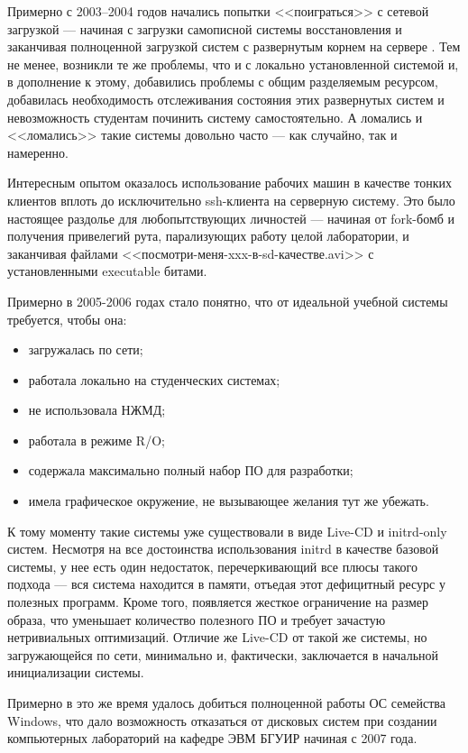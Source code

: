 \documentclass[10pt, a5paper]{article}
\begin{document}
Примерно с 2003--2004 годов начались попытки <<поиграться>> с сетевой загрузкой  --- начиная с загрузки самописной системы восстановления и заканчивая полноценной загрузкой систем с развернутым корнем на сервере \cite{SP01}. Тем не менее, возникли те же проблемы, что и с локально  установленной системой и, в дополнение к этому, добавились проблемы с общим разделяемым ресурсом, добавилась необходимость отслеживания состояния этих развернутых систем и невозможность студентам починить систему самостоятельно. А ломались и <<ломались>> такие системы довольно часто --- как случайно, так и намеренно.

Интересным опытом оказалось использование рабочих машин в качестве тонких клиентов вплоть до исключительно ssh-клиента на серверную систему. Это было настоящее раздолье для любопытствующих личностей --- начиная от fork-бомб и получения привелегий рута, парализующих работу целой лаборатории, и заканчивая файлами <<посмотри-меня-xxx-в-sd-качестве.avi>> с установленными executable битами.

Примерно в 2005-2006 годах стало понятно, что от идеальной учебной системы требуется, чтобы она:

\begin{itemize}
  \item загружалась по сети;
  \item работала локально на студенческих системах;
  \item не использовала НЖМД;
  \item работала в режиме R/O;
  \item содержала максимально полный набор ПО для разработки;
  \item имела графическое окружение, не вызывающее желания тут же убежать.
\end{itemize}

К тому моменту такие системы уже существовали в виде Live-CD и initrd-only систем.
Несмотря на все достоинства использования initrd в качестве базовой системы, у нее есть один недостаток, перечеркивающий все плюсы такого подхода --- вся система находится в памяти, отъедая этот дефицитный ресурс у полезных программ. Кроме того, появляется жесткое ограничение на размер образа, что уменьшает количество полезного ПО и требует зачастую нетривиальных оптимизаций.
Отличие же Live-CD от такой же системы, но загружающейся по сети, минимально и, фактически, заключается в начальной инициализации системы\cite{P01}.

Примерно в это же время удалось добиться полноценной работы ОС семейства Windows, что дало возможность отказаться от дисковых систем при создании компьютерных лабораторий на кафедре ЭВМ БГУИР начиная с 2007 года\cite{PGO01}.
\end{document}
